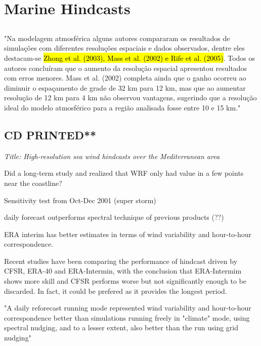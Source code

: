 \documentclass[12pt,a4paper]{article}
\begin{document}
\section{Marine Hindcasts}

\subsection{\cite{Lewis2017}}


"Na modelagem atmosférica alguns autores compararam os resultados de simulações com diferentes resoluções espaciais e dados observados, dentre eles destacam-se \hl{Zhong et al. (2003), Mass et al. (2002) e Rife et al. (2005)}. Todos os autores concluíram que o aumento da resolução espacial apresentou resultados com erros menores. Mass et al. (2002) completa ainda que o ganho ocorreu ao diminuir o espaçamento de grade de 32 km para 12 km, mas que ao aumentar resolução de 12 km para 4 km não observou vantagens, sugerindo que a resolução ideal do modelo atmosférico para a região analisada fosse entre 10 e 15 km."


\subsection{\cite{Menendez2014} CD PRINTED**}

\textit{Title: High-resolution sea wind hindcasts over the Mediterranean area}

Did a long-term study and realized that WRF only had value in a few points near the coastline?

Sensitivity test from Oct-Dec 2001 (super storm)

daily forecast outperforms spectral technique of previous products (??)

ERA interim has better estimates in terms of wind variability and hour-to-hour correspondence. 

Recent studies have been comparing the performance of hindcast driven by CFSR, ERA-40 and ERA-Intermin, with the conclusion that ERA-Intermim shows more skill and CFSR performs worse but not significantly enough to be discarded. In fact, it could be prefered as it provides the longest period. 

"A daily reforecast running mode represented wind variability and hour-to-hour correspondence better than simulations running freely in "climate" mode, using spectral nudging, and to a lesser extent, also better than the run using grid nudging"
\end{document}
